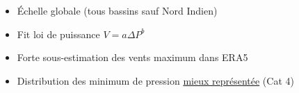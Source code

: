 \documentclass[aspectratio=169, usepdftitle=false, xcolor={dvipsnames}, 9pt,table]{beamer}
\begin{document}
\begin{frame}
\begin{columns}
\begin{column}{0.5\textwidth}
\begin{examples}[Méthodologie]
\begin{itemize}
                    \item Échelle globale (tous bassins sauf Nord Indien)
                    \item Fit loi de puissance $V = a\Delta P^b$ \parencite{atkinson_tropical_1977}
                \end{itemize}
            \end{examples}
            \vspace{2em}
            \begin{block}
                \begin{itemize}
                    \item \alert{Forte sous-estimation} des vents maximum dans ERA5
                    \item Distribution des minimum de pression \underline{mieux représentée} (Cat 4)
                \end{itemize}
            \end{block}
        \end{column}
    \end{columns} 
\end{frame}
\end{document}
